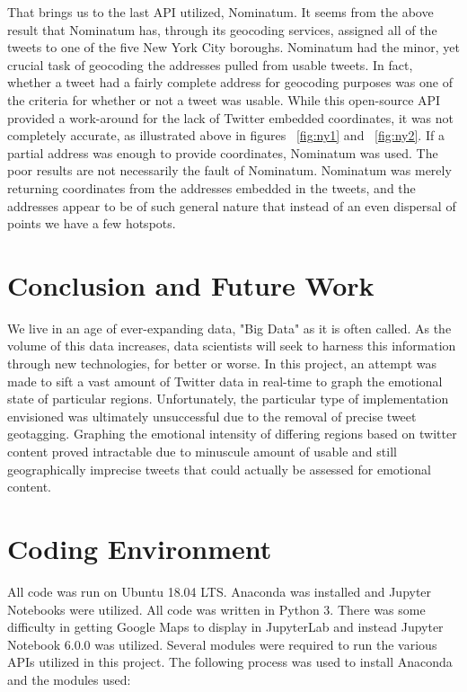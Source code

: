 \documentclass[12pt, oneside]{article}
\begin{document}
That brings us to the last API utilized, Nominatum. It seems from the above
result that Nominatum has, through its geocoding
services, assigned all of the tweets to one of the five New York City boroughs.
Nominatum had the minor, yet crucial task of geocoding the addresses pulled
from usable tweets. In fact, whether a tweet had a fairly complete address for
geocoding purposes was one of the criteria for whether or not a tweet was
usable. While this open-source API provided a work-around for the lack of
Twitter embedded coordinates, it was not completely accurate, as illustrated
above in figures ~\ref{fig:ny1} and ~\ref{fig:ny2}. If a partial address was
enough to provide coordinates, Nominatum was used. The poor
results are not necessarily the fault of Nominatum. Nominatum was merely
returning coordinates from the addresses embedded in the tweets, and the
addresses appear to be of such general nature that instead of an even dispersal
of points we have a few hotspots.


\section{Conclusion and Future Work}
We live in an age of ever-expanding data, "Big Data" as it is often called. As
the volume of this data increases, data scientists will seek to harness this
information through new technologies, for better or worse. In
this project, an attempt was made to sift a vast amount of Twitter data in
real-time to graph the emotional state of particular regions. Unfortunately,
the particular type of implementation envisioned was ultimately unsuccessful
due to the removal of precise tweet geotagging.
Graphing the emotional intensity of differing regions based on twitter content
proved intractable due to minuscule amount of usable and still geographically
imprecise tweets that could actually be assessed for emotional content.

\newpage{}




\newpage{}
\appendix{}
\section{Coding Environment}
All code was run on Ubuntu 18.04 LTS. Anaconda was installed and Jupyter
Notebooks were utilized. All code was written in Python 3. There was some
difficulty in getting Google Maps to display in JupyterLab and instead Jupyter
Notebook 6.0.0 was utilized. Several modules
were required to run the various APIs utilized in this project. The following
process was used to install Anaconda and the modules used:
\end{document}
